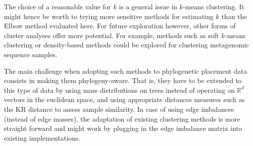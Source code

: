 The choice of a reasonable value for $k$ is a general issue in $k$-means clustering.
It might hence be worth to trying more sensitive methods for estimating $k$ than the Elbow method evaluated here.
For future exploration however, other forms of cluster analyses offer more potential.
For example, methods such as soft $k$-means clustering \cite{Dunn1973,Bezdek1981} or density-based methods \cite{Kriegel2011}
could be explored for clustering metagenomic sequence samples.

The main challenge when adopting such methods to phylogenetic placement data consists in making them phylogeny-aware.
That is, they have to be extended to this type of data by
using mass distributions on trees instead of operating on $\mathbb{R}^d$ vectors in the euclidean space,
and using appropriate distances measures such as the KR distance to assess sample similarity.
In case of using edge imbalances (instead of edge masses),
the adaptation of existing clustering methods is more straight forward
and might work by plugging in the edge imbalance matrix into existing implementations.

